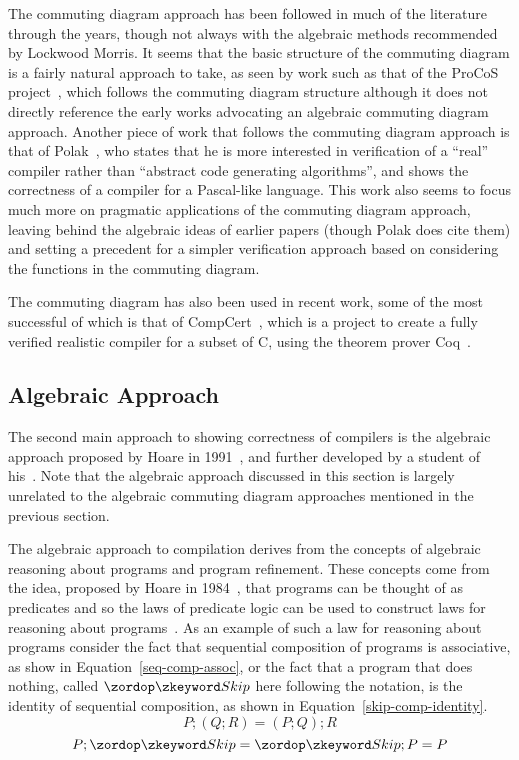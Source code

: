 \documentclass[a4paper,10pt]{article}
\begin{document}
The commuting diagram approach has been followed in much of the literature
through the years, though not always with the algebraic methods recommended by
Lockwood Morris.  It seems that the basic structure of the commuting diagram is
a fairly natural approach to take, as seen by work such as that of the ProCoS
project~\cite{buth1992}, which follows the commuting diagram structure although
it does not directly reference the early works advocating an algebraic commuting
diagram approach. Another piece of work that follows the commuting diagram
approach is that of Polak~\cite{polak1981}, who states that he is more
interested in verification of a ``real'' compiler rather than ``abstract code
generating algorithms'', and shows the correctness of a compiler for a
Pascal-like language.  This work also seems to focus much more on pragmatic
applications of the commuting diagram approach, leaving behind the algebraic
ideas of earlier papers (though Polak does cite them) and setting a precedent
for a simpler verification approach based on considering the functions in the
commuting diagram.

The commuting diagram has also been used in recent work, some of the most
successful of which is that of CompCert~\cite{leroy2009a, leroy2009b,
  leroy2012}, which is a project to create a fully verified realistic compiler
for a subset of C, using the theorem prover Coq~\cite{coq2004}.

\subsection{Algebraic Approach}
\label{algebraic-sec}

The second main approach to showing correctness of compilers is the algebraic
approach proposed by Hoare in 1991~\cite{hoare1991}, and further developed by a
student of his~\cite{hoare1993, sampaio1993, sampaio1997}. Note that the
algebraic approach discussed in this section is largely unrelated to the
algebraic commuting diagram approaches mentioned in the previous section.

The algebraic approach to compilation derives from the concepts of algebraic
reasoning about programs and program refinement. These concepts come from the
idea, proposed by Hoare in 1984~\cite{hoare1984}, that programs can be thought
of as predicates and so the laws of predicate logic can be used to construct
laws for reasoning about programs~\cite{hoare1987}. As an example of such a law
for reasoning about programs consider the fact that sequential composition of
programs is associative, as show in Equation~\eqref{seq-comp-assoc}, or the fact
that a program that does nothing, called $\Skip$ here following the \Circus{}
notation, is the identity of sequential composition, as shown in
Equation~\eqref{skip-comp-identity}.
\begin{equation}
  \label{seq-comp-assoc}
  P;(Q;R) = (P;Q);R
\end{equation}
\begin{equation}
  \label{skip-comp-identity}
  P;\Skip = \Skip;P = P
\end{equation}
\end{document}
